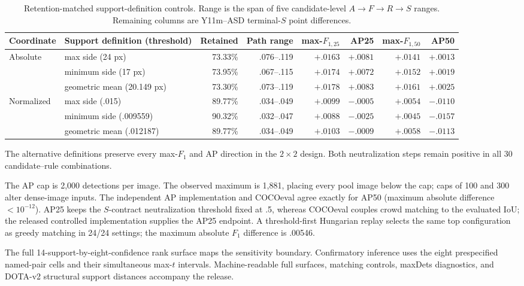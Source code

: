 \documentclass[journal]{IEEEtran}
\begin{document}
\begin{table}[!t]
\centering
\caption{Retention-matched support-definition controls. Range is the span of five candidate-level $A\!\rightarrow\!F\!\rightarrow\!R\!\rightarrow\!S$ ranges. Remaining columns are Y11m--ASD terminal-$S$ point differences.}\label{tab:alternative-support}
\tiny
\setlength{\tabcolsep}{2.4pt}\renewcommand{\arraystretch}{.96}
\begin{tabular}{llrrrrrr}
\toprule
Coordinate & Support definition (threshold) & Retained & Path range & max-$F_{1,25}$ & AP25 & max-$F_{1,50}$ & AP50\\
\midrule
Absolute & max side (24 px) & 73.33\% & .076--.119 & $+.0163$ & $+.0081$ & $+.0141$ & $+.0013$\\
 & minimum side (17 px) & 73.95\% & .067--.115 & $+.0174$ & $+.0072$ & $+.0152$ & $+.0019$\\
 & geometric mean (20.149 px) & 73.30\% & .073--.119 & $+.0178$ & $+.0083$ & $+.0161$ & $+.0025$\\
Normalized & max side (.015) & 89.77\% & .034--.049 & $+.0099$ & $-.0005$ & $+.0054$ & $-.0110$\\
 & minimum side (.009559) & 90.32\% & .032--.047 & $+.0088$ & $-.0025$ & $+.0045$ & $-.0157$\\
 & geometric mean (.012187) & 89.77\% & .034--.049 & $+.0103$ & $-.0009$ & $+.0058$ & $-.0113$\\
\bottomrule
\end{tabular}
\end{table}

The alternative definitions preserve every max-$F_1$ and AP direction in the $2\!\times\!2$ design. Both neutralization steps remain positive in all 30 candidate--rule combinations.

The AP cap is 2,000 detections per image. The observed maximum is 1,881, placing every pool image below the cap; caps of 100 and 300 alter dense-image inputs. The independent AP implementation and COCOeval agree exactly for AP50 (maximum absolute difference $<10^{-12}$). AP25 keeps the $S$-contract neutralization threshold fixed at .5, whereas COCOeval couples crowd matching to the evaluated IoU; the released controlled implementation supplies the AP25 endpoint. A threshold-first Hungarian replay selects the same top configuration as greedy matching in 24/24 settings; the maximum absolute $F_1$ difference is .00546.

The full 14-support-by-eight-confidence rank surface maps the sensitivity boundary. Confirmatory inference uses the eight prespecified named-pair cells and their simultaneous max-$t$ intervals. Machine-readable full surfaces, matching controls, maxDets diagnostics, and DOTA-v2 structural support distances accompany the release.
\end{document}
